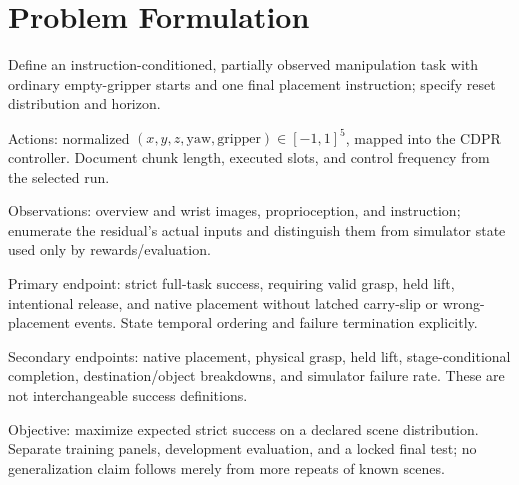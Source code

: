\section{Problem Formulation}\label{sec:problem}
\begin{outline}
\item Define an instruction-conditioned, partially observed manipulation task with ordinary empty-gripper starts and one final placement instruction; specify reset distribution and horizon.
\item Actions: normalized $(x,y,z,\mathrm{yaw},\mathrm{gripper})\in[-1,1]^5$, mapped into the CDPR controller. Document chunk length, executed slots, and control frequency from the selected run.
\item Observations: overview and wrist images, proprioception, and instruction; enumerate the residual's actual inputs and distinguish them from simulator state used only by rewards/evaluation.
\item Primary endpoint: strict full-task success, requiring valid grasp, held lift, intentional release, and native placement without latched carry-slip or wrong-placement events. State temporal ordering and failure termination explicitly.
\item Secondary endpoints: native placement, physical grasp, held lift, stage-conditional completion, destination/object breakdowns, and simulator failure rate. These are not interchangeable success definitions.
\item Objective: maximize expected strict success on a declared scene distribution. Separate training panels, development evaluation, and a locked final test; no generalization claim follows merely from more repeats of known scenes.
\end{outline}
